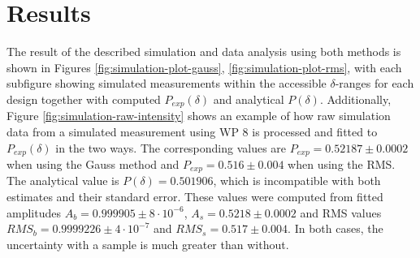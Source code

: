 \section{Results}
The result of the described simulation and data analysis using both methods is shown in Figures \ref{fig:simulation-plot-gauss}, \ref{fig:simulation-plot-rms}, with each subfigure showing simulated measurements within the accessible $\delta$-ranges for each design together with computed $P_{exp}(\delta)$ and analytical $P(\delta)$. Additionally, Figure \ref{fig:simulation-raw-intensity} shows an example of how raw simulation data from a simulated measurement using WP 8 is processed and fitted to $P_{exp}(\delta)$ in the two ways. The corresponding values are $P_{exp} = 0.52187 \pm 0.0002$ when using the Gauss method and $P_{exp} = 0.516 \pm 0.004$ when using the RMS. The analytical value is $P(\delta) = 0.501906$, which is incompatible with both estimates and their standard error. These values were computed from fitted amplitudes $A_b = 0.999905 \pm 8\cdot 10^{-6}$, $A_s = 0.5218 \pm 0.0002$ and RMS values $RMS_b = 0.9999226 \pm 4\cdot 10^{-7}$ and $RMS_s = 0.517 \pm 0.004$. In both cases, the uncertainty with a sample is much greater than without.
